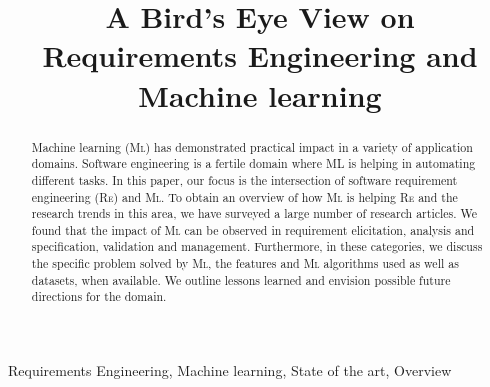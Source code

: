 \documentclass[conference]{IEEEtran}
\newcommand{\RE}{\textsc{Re}\xspace}
\newcommand{\ML}{\textsc{Ml}\xspace}
\begin{document}
\title{A Bird’s Eye View on Requirements Engineering and Machine learning} 

\author{
\and
{} 
\and
{}
}   
\maketitle

\begin{abstract}
Machine learning (\ML) has demonstrated practical impact in a variety of
application domains. Software engineering is a fertile domain where ML is
helping in automating  different tasks. In this paper, our focus is the
intersection of software requirement engineering (\RE) and \ML. To obtain an
overview of how \ML is helping \RE and the research trends in this area, we have
surveyed a large number of research articles. We found that the impact of \ML
can be observed in requirement elicitation, analysis and specification, validation
and management. Furthermore, in these categories, we discuss the specific
problem solved by \ML, the features and \ML algorithms used as well as datasets,
when available. We outline lessons learned and envision possible future directions
for the domain.
\end{abstract} 

\begin{IEEEkeywords}
Requirements Engineering, Machine learning, State of the art, Overview
\end{IEEEkeywords}
  
 
 
   
 
  
 
  
\end{document}
